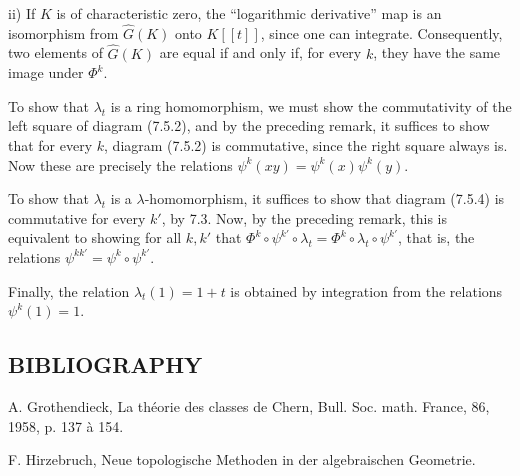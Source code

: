 ii) If \(K\) is of characteristic zero, the ``logarithmic derivative'' map is an isomorphism from \(\widehat G(K)\) onto \(K[[t]]\), since one can integrate. Consequently, two elements of \(\widehat G(K)\) are equal if and only if, for every \(k\), they have the same image under \(\Phi^k\).

To show that \(\lambda_t\) is a ring homomorphism, we must show the commutativity of the left square of diagram (7.5.2), and by the preceding remark, it suffices to show that for every \(k\), diagram (7.5.2) is commutative, since the right square always is. Now these are precisely the relations \(\psi^k(xy)=\psi^k(x)\psi^k(y)\).

To show that \(\lambda_t\) is a \(\lambda\)-homomorphism, it suffices to show that diagram (7.5.4) is commutative for every \(k'\), by 7.3. Now, by the preceding remark, this is equivalent to showing for all \(k,k'\) that \(\Phi^k\circ\psi^{k'}\circ\lambda_t=\Phi^k\circ\lambda_t\circ\psi^{k'}\), that is, the relations \(\psi^{kk'}=\psi^k\circ\psi^{k'}\).

Finally, the relation \(\lambda_t(1)=1+t\) is obtained by integration from the relations \(\psi^k(1)=1\).

\subsection*{BIBLIOGRAPHY}
\begin{enumerate}[label={[\arabic*]}]
\item A. Grothendieck, La théorie des classes de Chern, Bull. Soc. math. France, 86, 1958, p. 137 à 154.
\item F. Hirzebruch, Neue topologische Methoden in der algebraischen Geometrie.
\end{enumerate}

\providecommand{\Sym}{\operatorname{Sym}}
\providecommand{\Proj}{\operatorname{Proj}}
\providecommand{\Projz}{\operatorname{Proj}_0}
\providecommand{\Spec}{\operatorname{Spec}}
\providecommand{\Comp}{\operatorname{Comp}}
\providecommand{\Dplus}{D_{+}}
\providecommand{\id}{\operatorname{id}}
\providecommand{\cG}{\mathcal G}
\providecommand{\cA}{\mathcal A}
\providecommand{\cB}{\mathcal B}
\providecommand{\cL}{\mathscr L}
\providecommand{\cM}{\mathscr M}
\providecommand{\cN}{\mathscr N}
\providecommand{\cE}{\mathscr E}
\providecommand{\cK}{\mathscr K}
\providecommand{\cP}{\mathscr P}
\providecommand{\cQ}{\mathscr Q}
\providecommand{\OO}{\mathcal O}
\providecommand{\rk}{\operatorname{rk}}
\providecommand{\colim}{\operatorname*{colim}}

